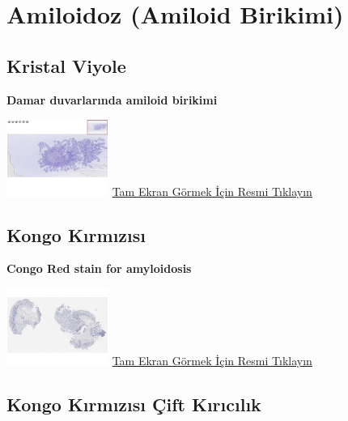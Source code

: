 \documentclass[
  letterpaper,
  DIV=11,
  numbers=noendperiod]{scrreprt}
\begin{document}
\hypertarget{sec-amiloidoz}{%
\chapter{Amiloidoz (Amiloid Birikimi)}\label{sec-amiloidoz}}

\hypertarget{sec-amiloidoz-kristal-viyole}{%
\section{Kristal Viyole}\label{sec-amiloidoz-kristal-viyole}}

\textbf{Damar duvarlarında amiloid birikimi}

\href{https://images.patolojiatlasi.com/amyloid/crystalviolet.html}{\includegraphics[width=0.25\textwidth,height=\textheight]{./screenshots/crystalviolet_screenshot.png}}
\href{https://images.patolojiatlasi.com/amyloid/crystalviolet.html}{Tam
Ekran Görmek İçin Resmi Tıklayın}

\hypertarget{sec-amiloidoz-kongo-kirmizisi}{%
\section{Kongo Kırmızısı}\label{sec-amiloidoz-kongo-kirmizisi}}

\textbf{Congo Red stain for amyloidosis}

\href{https://images.patolojiatlasi.com/congored/congored.html}{\includegraphics[width=0.25\textwidth,height=\textheight]{./screenshots/congored_screenshot.png}}
\href{https://images.patolojiatlasi.com/congored/congored.html}{Tam
Ekran Görmek İçin Resmi Tıklayın}

\hypertarget{sec-amiloidoz-kongo-kirmizisi-cift-kiricilik}{%
\section{Kongo Kırmızısı Çift
Kırıcılık}\label{sec-amiloidoz-kongo-kirmizisi-cift-kiricilik}}
\end{document}
